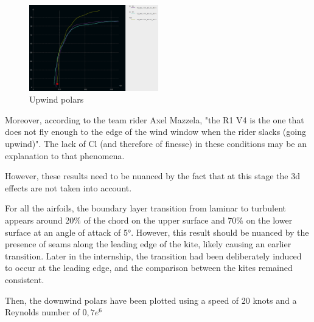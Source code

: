 \begin{figure}[H]
    \centering
    \includegraphics[width=0.5\textwidth]{figures/2D steady simulations/xflr5/Polar upwind.png}
    \caption{Upwind polars}
    \label{fig:Upwind_polars}
\end{figure}

Moreover, according to the team rider Axel Mazzela, "the R1 V4 is the one that does not fly enough to the edge of the wind window when the rider slacks (going upwind)". The lack of Cl (and therefore of finesse) in these conditions may be an explanation to that phenomena. 

However, these results need to be nuanced by the fact that at this stage the 3d effects are not taken into account.

For all the airfoils, the boundary layer transition from laminar to turbulent appears around 20$\%$ of the chord on the upper surface and 70$\%$ on the lower surface at an angle of attack of 5°. However, this result should be nuanced by the presence of seams along the leading edge of the kite, likely causing an earlier transition. Later in the internship, the transition had been deliberately induced to occur at the leading edge, and the comparison between the kites remained consistent.

\vspace{1cm}
Then, the downwind polars have been plotted using a speed of 20 knots and a Reynolds number of $0,7e^{6}$


